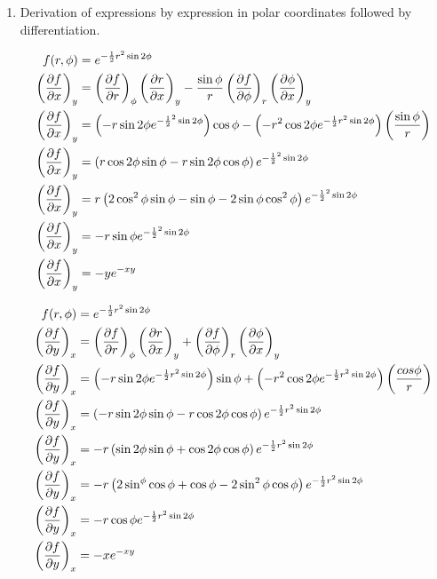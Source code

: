 \documentclass[10pt,\jkfside,a4paper]{article}
\begin{document}
\begin{enumerate}
\begin{enumerate}
\item Derivation of expressions by expression in polar coordinates followed by differentiation.

\begin{equation}
\begin{split}
f(r, \phi) &= e^{-\frac{1}{2}r^2\sin 2 \phi} \\
\left(\pdv{f}{x}\right)_y &= \left(\pdv{f}{r}\right)_\phi \left(\pdv{r}{x}\right)_y - \frac{\sin\phi}{r} \left(\pdv{f}{\phi}\right)_r \left(\pdv{\phi}{x}\right)_y \\
\left(\pdv{f}{x}\right)_y &= \left(- r \sin 2 \phi e^{-\frac{1}{2}^2\sin 2 \phi}\right)\cos\phi - \left(- r^2 \cos 2 \phi e^{-\frac{1}{2}r^2 \sin 2\phi}\right)\left(\frac{\sin \phi}{r}\right) \\
\left(\pdv{f}{x}\right)_y &= \left(r \cos 2 \phi \sin \phi - r \sin 2 \phi \cos \phi\right)e^{-\frac{1}{2}^2\sin 2 \phi} \\
\left(\pdv{f}{x}\right)_y &= r\left(2 \cos^2 \phi \sin \phi - \sin \phi - 2 \sin \phi \cos^2 \phi\right)e^{-\frac{1}{2}^2\sin 2 \phi} \\
\left(\pdv{f}{x}\right)_y &= - r\sin \phi e^{-\frac{1}{2}^2\sin 2 \phi} \\
\left(\pdv{f}{x}\right)_y &= - y e^{-xy} \\
\end{split}
\end{equation}

\begin{equation}
\begin{split}
f(r, \phi) &= e^{-\frac{1}{2}r^2 \sin 2\phi} \\
\left(\pdv{f}{y}\right)_x &= \left(\pdv{f}{r}\right)_\phi \left(\pdv{r}{x}\right)_y + \left(\pdv{f}{\phi}\right)_r \left(\pdv{\phi}{x}\right)_y \\
\left(\pdv{f}{y}\right)_x &= \left(- r \sin 2 \phi e^{-\frac{1}{2}r^2 \sin 2 \phi}\right) \sin \phi + \left(- r^2 \cos 2 \phi e^{-\frac{1}{2}r^2\sin 2 \phi}\right)\left(\frac{cos\phi}{r}\right) \\
\left(\pdv{f}{y}\right)_x &= \left(- r \sin 2 \phi \sin \phi - r \cos 2 \phi \cos \phi \right)e^{-\frac{1}{2}r^2 \sin 2 \phi} \\
\left(\pdv{f}{y}\right)_x &= -r\left(\sin 2 \phi \sin \phi + \cos 2 \phi \cos \phi \right)e^{-\frac{1}{2}r^2 \sin 2 \phi} \\
\left(\pdv{f}{y}\right)_x &= -r\left(2\sin^ \phi \cos \phi + \cos \phi - 2 \sin^2 \phi \cos \phi \right)e^{-\frac{1}{2}r^2 \sin 2 \phi} \\
\left(\pdv{f}{y}\right)_x &= -r\cos \phi e^{-\frac{1}{2}r^2 \sin 2 \phi} \\
\left(\pdv{f}{y}\right)_x &= -x e^{-xy} \\
\end{split}
\end{equation}


\end{enumerate}
\end{enumerate}
\end{document}
